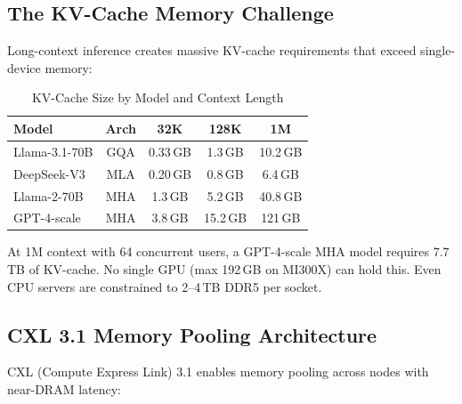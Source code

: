 \documentclass[conference,10pt]{IEEEtran}
\begin{document}
\subsection{The KV-Cache Memory Challenge}

Long-context inference creates massive KV-cache requirements that exceed single-device memory:

\begin{table}[!htbp]
\caption{KV-Cache Size by Model and Context Length}
\label{tab:kvsize}
\centering\footnotesize
\begin{tabular}{@{}lcccc@{}}
\toprule
\textbf{Model} & \textbf{Arch} & \textbf{32K} & \textbf{128K} & \textbf{1M} \\
\midrule
Llama-3.1-70B & GQA & 0.33\,GB & 1.3\,GB & 10.2\,GB \\
DeepSeek-V3 & MLA & 0.20\,GB & 0.8\,GB & 6.4\,GB \\
Llama-2-70B & MHA & 1.3\,GB & 5.2\,GB & 40.8\,GB \\
GPT-4-scale & MHA & 3.8\,GB & 15.2\,GB & 121\,GB \\
\bottomrule
\end{tabular}
\end{table}

At 1M context with 64 concurrent users, a GPT-4-scale MHA model requires 7.7\,TB of KV-cache. No single GPU (max 192\,GB on MI300X) can hold this. Even CPU servers are constrained to 2--4\,TB DDR5 per socket.

\subsection{CXL 3.1 Memory Pooling Architecture}

CXL (Compute Express Link) 3.1 enables memory pooling across nodes with near-DRAM latency:
\end{document}
